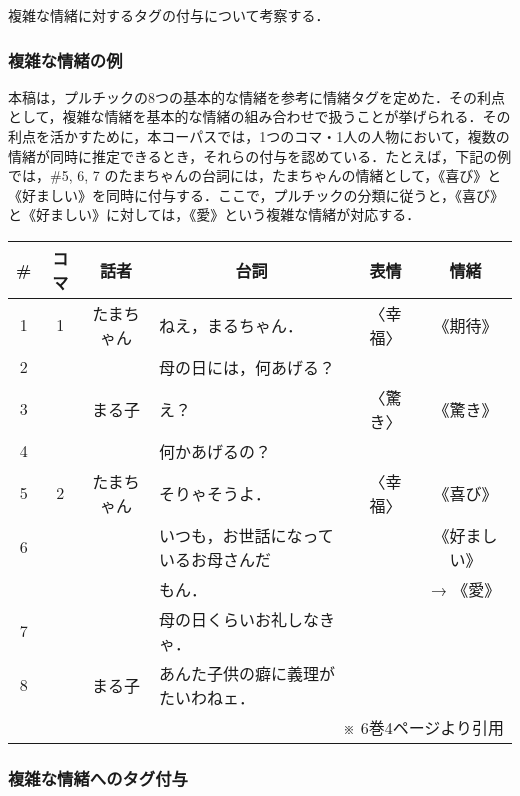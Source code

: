 \documentclass[japanese]{jnlp_1.3c}
\begin{document}
複雑な情緒に対するタグの付与について考察する．

\subsubsection{複雑な情緒の例}

本稿は，プルチックの8つの基本的な情緒を参考に情緒タグを定めた．その利点として，複雑な情緒を基本的な情緒の組み合わせで扱うことが挙げられる．その利点を活かすために，本コーパスでは，1つのコマ・1人の人物において，複数の情緒が同時に推定できるとき，それらの付与を認めている．たとえば，下記の例では，\#5, 6, 7 のたまちゃんの台詞には，たまちゃんの情緒として，《喜び》と《好ましい》を同時に付与する．ここで，プルチックの分類に従うと，《喜び》と《好ましい》に対しては，《愛》という複雑な情緒が対応する．

\vspace{\baselineskip}
\begin{center}
\begin{tabular}{|c|c|c|l|c|c|}
\hline
\# & コマ & 話者 & \multicolumn{1}{|c|}{台詞} & 表情 & 情緒 \\
\hline
1&1&たまちゃん& ねえ，まるちゃん．                  &〈幸福〉&《期待》\\
\cline{1-1} \cline{4-4}
2& &          & 母の日には，何あげる？              &        &\\
\cline{1-1} \cline{3-6}
3& &まる子    & え？                                &〈驚き〉&《驚き》\\
\cline{1-1} \cline{4-4}
4& &          & 何かあげるの？                      &        &\\
\hline
5&2&たまちゃん& そりゃそうよ．                      &〈幸福〉&《喜び》\\
\cline{1-1} \cline{4-4}
6& &          & いつも，お世話になっているお母さんだ&        &《好ましい》\\
 & &          & もん．                              &        &→ 《愛》\\
\cline{1-1} \cline{4-4}
7& &          & 母の日くらいお礼しなきゃ．          &        &\\
\cline{1-1} \cline{3-6}
8& &まる子    & あんた子供の癖に義理がたいわねェ．  &        &\\
\hline
\multicolumn{6}{r}{※ 6巻4ページより引用}
\end{tabular}
\end{center}

\subsubsection{複雑な情緒へのタグ付与}
\end{document}
